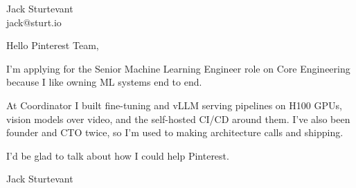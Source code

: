\documentclass[11pt]{article}
\begin{document}
\raggedright

{\namefont\fontsize{20pt}{24pt}\selectfont Jack Sturtevant}\\[-0.3em]
jack@sturt.io

\vspace{1.2em}

Hello Pinterest Team,

I'm applying for the Senior Machine Learning Engineer role on Core Engineering because I like owning ML systems end to end.

At Coordinator I built fine-tuning and vLLM serving pipelines on H100 GPUs, vision models over video, and the self-hosted CI/CD around them. I've also been founder and CTO twice, so I'm used to making architecture calls and shipping.

I'd be glad to talk about how I could help Pinterest.

\vspace{0.6em}
Jack Sturtevant
\end{document}
